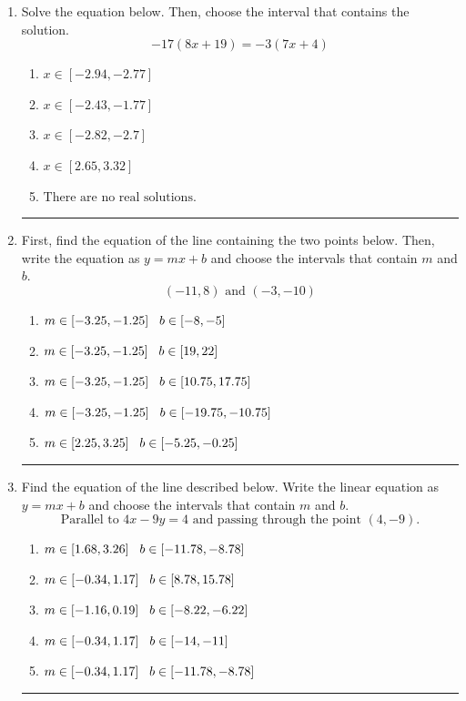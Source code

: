 \documentclass[14pt]{extbook}
\newcommand{\litem}[1]{\item#1\hspace*{-1cm}\rule{\textwidth}{0.4pt}}
\begin{document}
\begin{enumerate}
\litem{
Solve the equation below. Then, choose the interval that contains the solution.\[ -17(8x + 19) = -3(7x + 4) \]\begin{enumerate}[label=\Alph*.]
\item \( x \in [-2.94, -2.77] \)
\item \( x \in [-2.43, -1.77] \)
\item \( x \in [-2.82, -2.7] \)
\item \( x \in [2.65, 3.32] \)
\item \( \text{There are no real solutions.} \)

\end{enumerate} }
\litem{
First, find the equation of the line containing the two points below. Then, write the equation as $ y=mx+b $ and choose the intervals that contain $m$ and $b$.\[ (-11, 8) \text{ and } (-3, -10) \]\begin{enumerate}[label=\Alph*.]
\item \( m \in [-3.25, -1.25] \hspace*{3mm} b \in [-8, -5] \)
\item \( m \in [-3.25, -1.25] \hspace*{3mm} b \in [19, 22] \)
\item \( m \in [-3.25, -1.25] \hspace*{3mm} b \in [10.75, 17.75] \)
\item \( m \in [-3.25, -1.25] \hspace*{3mm} b \in [-19.75, -10.75] \)
\item \( m \in [2.25, 3.25] \hspace*{3mm} b \in [-5.25, -0.25] \)

\end{enumerate} }
\litem{
Find the equation of the line described below. Write the linear equation as $ y=mx+b $ and choose the intervals that contain $m$ and $b$.\[ \text{Parallel to } 4 x - 9 y = 4 \text{ and passing through the point } (4, -9). \]\begin{enumerate}[label=\Alph*.]
\item \( m \in [1.68, 3.26] \hspace*{3mm} b \in [-11.78, -8.78] \)
\item \( m \in [-0.34, 1.17] \hspace*{3mm} b \in [8.78, 15.78] \)
\item \( m \in [-1.16, 0.19] \hspace*{3mm} b \in [-8.22, -6.22] \)
\item \( m \in [-0.34, 1.17] \hspace*{3mm} b \in [-14, -11] \)
\item \( m \in [-0.34, 1.17] \hspace*{3mm} b \in [-11.78, -8.78] \)


\end{enumerate}}
\end{enumerate}
\end{document}
